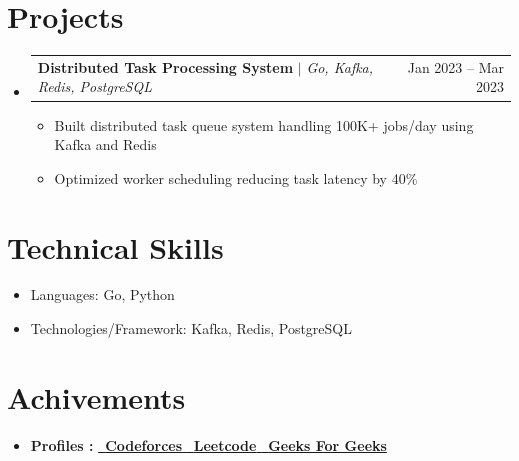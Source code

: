 \documentclass[letterpaper,11pt]{article}
\makeatletter
\newcommand{\resumeItem}[1]{
  \item\small{
    {#1 \vspace{-2pt}}
  }
}
\newcommand{\resumeProjectHeading}[2]{
    \item
    \begin{tabular*}{0.97\textwidth}{l@{\extracolsep{\fill}}r}
      \small#1 & #2 \\
    \end{tabular*}\vspace{-7pt}
}
\newcommand{\resumeSubItem}[1]{\resumeItem{#1}\vspace{-4pt}}
\newcommand{\resumeSubHeadingListStart}{\begin{itemize}[leftmargin=0.15in, label={}]}
\newcommand{\resumeSubHeadingListEnd}{\end{itemize}}
\newcommand{\resumeItemListStart}{\begin{itemize}}
\newcommand{\resumeItemListEnd}{\end{itemize}\vspace{-5pt}}
\makeatother
\begin{document}
\section{Projects}
\resumeSubHeadingListStart

\resumeProjectHeading{\textbf{Distributed Task Processing System} $|$ \emph{Go, Kafka, Redis, PostgreSQL}}{Jan 2023 – Mar 2023}

\resumeItemListStart
\resumeItem{Built distributed task queue system handling 100K+ jobs/day using Kafka and Redis}
\resumeItem{Optimized worker scheduling reducing task latency by 40\%}
\resumeItemListEnd

\resumeSubHeadingListEnd

\section{Technical Skills}
	\resumeSubHeadingListStart
        \resumeSubItem{Languages: Go, Python}
        \resumeSubItem{Technologies/Framework: Kafka, Redis, PostgreSQL}
        \resumeSubHeadingListEnd
\vspace{-5pt}
\vspace{-7pt}
\section{Achivements}
  \resumeSubHeadingListStart

      \resumeItemListStart
       \resumeItem{Received awards from amazon and cvent at multiple instances for outstanding performances and begin a team player}
        \resumeItem{Rated in Top 2\% of \textbf{Leetcode} in a pool of 350000 users.}
        \resumeItem{\textbf{Expert} on \textbf{Codeforces}, \textbf{Rating : 1611}}
      \resumeItemListEnd
      \vspace{-5pt}
    \resumeItem{\textbf{Profiles :}
    \href{https://codeforces.com/profile/noob_tusharb}{\ {\textbf{Codeforces }}}}{}\href{https://leetcode.com/noob_tusharb/}{\ \textbf{Leetcode} }{} \href{https://auth.geeksforgeeks.org/user/tusharextra75/practice/}{\ {\textbf{Geeks For Geeks}}} 
    \resumeSubHeadingListEnd
    \vspace{-10pt}
\end{document}
